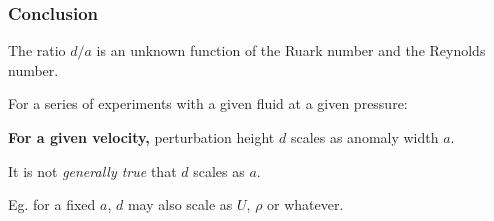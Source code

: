 \documentclass[]{article}
\begin{document}
\subsubsection*{Conclusion}
The ratio $d/a$ is an unknown function of the Ruark number and the Reynolds number.

For a series of experiments with a given fluid at a given pressure:

\textbf{For a given velocity,} perturbation height $d$ scales as anomaly width $a$.

\vspace{1em} 
It is not \emph{generally true} that $d$ scales as $a$.

Eg. for a fixed $a$, $d$ may also scale as $U$, $\rho$ or whatever.

\vspace*{3em}
\end{document}
